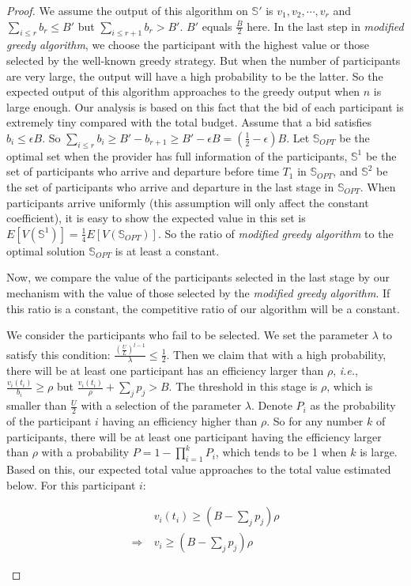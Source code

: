 \documentclass[10pt,journal,letterpaper,compsoc]{IEEEtran}
\newcommand{\ie}{{\em i.e.}}
\begin{document}
\begin{proof}
We assume the output of this algorithm on $\mathbb{S}'$ is ${v_1,v_2,\cdots, v_r}$ and $\sum_{i \le r} b_r \le B'$ but $\sum_{i \le r+1} b_r > B' $. $B'$ equals $\frac{B}{2}$ here. In the last step in \emph{modified greedy algorithm}, we choose the participant with the highest value or those selected by the  well-known greedy strategy. But when the number of participants are very large, the output will have a high probability to be the latter. So the expected output of this algorithm approaches to the greedy output when $n$ is large enough. Our analysis is based on this fact that the bid of each participant is extremely tiny compared with the total budget. Assume that a bid satisfies $b_i \le \epsilon B$. So $\sum_{i \le r} b_i \ge B'-b_{r+1} \ge B'-\epsilon B =(\frac{1}{2}-\epsilon)B$. Let $\mathbb{S}_{OPT}$ be the optimal set when the provider has full information of the participants, $\mathbb{S}^1$ be the set of participants who arrive and departure before time $T_1$ in $\mathbb{S}_{OPT}$, and $\mathbb{S}^2$ be the set of participants who arrive and departure in the last stage in $\mathbb{S}_{OPT}$. When participants arrive uniformly (this assumption will only affect the constant coefficient), it is easy to show the expected value in this set is $E[V(\mathbb{S}^1)]=\frac{1}{4}E[V(\mathbb{S}_{OPT})]$. So the ratio of \emph{modified greedy algorithm} to the optimal solution $\mathbb{S}_{OPT}$ is at least a constant.

Now, we compare the value of the participants selected in the last stage by our mechanism with the value of those selected by the \emph{modified greedy algorithm}. If this ratio is a constant, the competitive ratio of our algorithm will be a constant.

We consider the participants who fail to be selected. We set the parameter $\lambda$ to satisfy this condition: $\frac{\left(\frac{U}{L}\right)^{l-1}}{\lambda} \le \frac{1}{2}$. Then we claim that with a high probability, there will be at least one participant has an efficiency larger than $\rho$, \ie, $\frac{v_i(t_i)}{b_i} \ge \rho$ but $\frac{v_i(t_i)}{\rho }+\sum_{j}p_j > B$. The threshold in this stage is $\rho$, which is smaller than $\frac{U}{2}$ with a selection of the parameter $\lambda$. Denote $P_i$ as the probability of the participant $i$ having an efficiency higher than $\rho$. So for any number $k$ of participants, there will be at least one participant having the efficiency larger than $\rho$ with a probability $P=1-\prod_{i=1}^kP_i$, which tends to be 1 when $k$ is large. Based on this, our expected total value approaches to the total value estimated below. For this participant $i$:
\begin{small}
\begin{align}
\nonumber &v_i(t_i) \ge (B-\sum_{j}p_j)\rho \\
\nonumber \Rightarrow\ &v_i \ge (B-\sum_{j}p_j)\rho
\end{align}
\end{small}


\end{proof}
\end{document}

